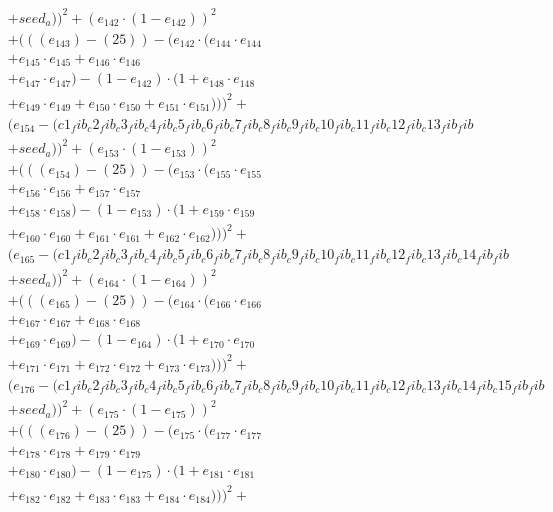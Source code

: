 \documentclass[10pt, a4paper]{article}
\begin{document}
\begin{small}
\begin{align*}
& + seed_a))^{2} + (e_{142} \cdot (1 - e_{142}))^{2} \\
& + (((e_{143}) - (25)) - (e_{142} \cdot (e_{144} \cdot e_{144} \\
& + e_{145} \cdot e_{145} + e_{146} \cdot e_{146} \\
& + e_{147} \cdot e_{147}) - (1 - e_{142}) \cdot (1 + e_{148} \cdot e_{148} \\
& + e_{149} \cdot e_{149} + e_{150} \cdot e_{150} + e_{151} \cdot e_{151})))^{2} + \\
& (e_{154} - (c1_fib_c2_fib_c3_fib_c4_fib_c5_fib_c6_fib_c7_fib_c8_fib_c9_fib_c10_fib_c11_fib_c12_fib_c13_fib_fib \\
& + seed_a))^{2} + (e_{153} \cdot (1 - e_{153}))^{2} \\
& + (((e_{154}) - (25)) - (e_{153} \cdot (e_{155} \cdot e_{155} \\
& + e_{156} \cdot e_{156} + e_{157} \cdot e_{157} \\
& + e_{158} \cdot e_{158}) - (1 - e_{153}) \cdot (1 + e_{159} \cdot e_{159} \\
& + e_{160} \cdot e_{160} + e_{161} \cdot e_{161} + e_{162} \cdot e_{162})))^{2} + \\
& (e_{165} - (c1_fib_c2_fib_c3_fib_c4_fib_c5_fib_c6_fib_c7_fib_c8_fib_c9_fib_c10_fib_c11_fib_c12_fib_c13_fib_c14_fib_fib \\
& + seed_a))^{2} + (e_{164} \cdot (1 - e_{164}))^{2} \\
& + (((e_{165}) - (25)) - (e_{164} \cdot (e_{166} \cdot e_{166} \\
& + e_{167} \cdot e_{167} + e_{168} \cdot e_{168} \\
& + e_{169} \cdot e_{169}) - (1 - e_{164}) \cdot (1 + e_{170} \cdot e_{170} \\
& + e_{171} \cdot e_{171} + e_{172} \cdot e_{172} + e_{173} \cdot e_{173})))^{2} + \\
& (e_{176} - (c1_fib_c2_fib_c3_fib_c4_fib_c5_fib_c6_fib_c7_fib_c8_fib_c9_fib_c10_fib_c11_fib_c12_fib_c13_fib_c14_fib_c15_fib_fib \\
& + seed_a))^{2} + (e_{175} \cdot (1 - e_{175}))^{2} \\
& + (((e_{176}) - (25)) - (e_{175} \cdot (e_{177} \cdot e_{177} \\
& + e_{178} \cdot e_{178} + e_{179} \cdot e_{179} \\
& + e_{180} \cdot e_{180}) - (1 - e_{175}) \cdot (1 + e_{181} \cdot e_{181} \\
& + e_{182} \cdot e_{182} + e_{183} \cdot e_{183} + e_{184} \cdot e_{184})))^{2} + \\

\end{align*}
\end{small}
\end{document}
